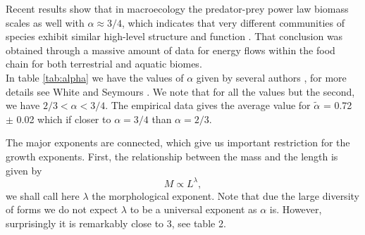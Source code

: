 \documentclass[10pt]{iopart}
\begin{document}
Recent results  show  that in macroecology the predator-prey power law biomass scales as well with $\alpha\approx 3/4$, which indicates that very different communities of species exhibit similar high-level structure and function \cite{Hatton15,Cebrian16}. That conclusion was obtained through a massive amount of data for energy flows within the food chain for both terrestrial and aquatic biomes.\\

In table \ref{tab:alpha} we have the values of $\alpha$ given by several authors \cite{Kleiber32,Gano38,Brody45,Hayssen85,Elgar87,McNab88,Heusner91,Lovegrove00,Symonds02,White03,Savage04}, for more details see White and Seymours \cite{White05}. We note that for all the values but the second, we have $2/3 < \alpha < 3/4$. The empirical data  gives the average value for $\tilde{\alpha}$ = 0.72 $\pm$ 0.02 which if closer to $\alpha = 3/4$ than $\alpha = 2/3$.

The major exponents are connected, which give us important restriction for the growth exponents. First,
the relationship between the mass and the length is given by
\begin{equation}
M \propto L^\lambda,
\label{lamb}
\end{equation}
we shall call here $\lambda$  the morphological exponent.  Note that due the large diversity of forms we do not expect  $\lambda$  to be a universal exponent as $\alpha$ is. However, surprisingly it is remarkably close to $3$, see table 2.
\end{document}
